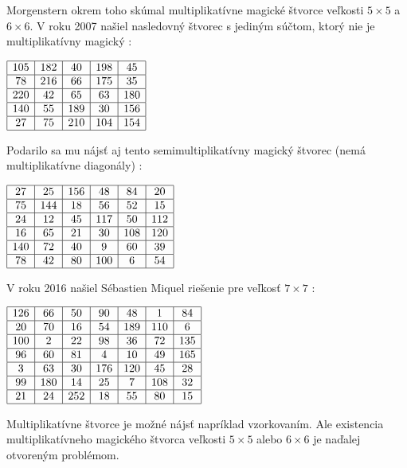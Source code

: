 Morgenstern okrem toho skúmal multiplikatívne magické štvorce veľkosti $5 \times 5$ a $6 \times 6$. V roku 2007 našiel nasledovný štvorec s jediným súčtom, ktorý nie je multiplikatívny magický \cite{multimagie}:

\begin{center}
$\begin{array}{ |c|c|c|c|c| }
\hline
105 & 182 & 40 & 198 & 45 \\ 
\hline
78 & 216 & 66 & 175 & 35  \\ 
\hline
220 & 42 & 65 & 63 & 180 \\ 
\hline
140 & 55 & 189 & 30 & 156 \\ 
\hline
27 & 75 & 210 & 104 & 154 \\ 
\hline
\end{array}$
\end{center}

Podarilo sa mu nájsť aj tento semimultiplikatívny magický štvorec (nemá multiplikatívne diagonály) \cite{multimagie}:

\begin{center}
$\begin{array}{ |c|c|c|c|c|c| }
\hline
27 & 25 & 156 & 48 & 84 & 20 \\ 
\hline
75 & 144 & 18 & 56 & 52 & 15 \\ 
\hline
24 & 12 & 45 & 117 & 50 & 112 \\ 
\hline
16 & 65 & 21 & 30 & 108 & 120 \\ 
\hline
140 & 72 & 40 & 9 & 60 & 39 \\ 
\hline
78 & 42 & 80 & 100 & 6 & 54 \\
\hline
\end{array}$
\end{center}

V roku 2016 našiel Sébastien Miquel riešenie pre veľkosť $7 \times 7$  \cite{multimagie}:

\begin{center}
$\begin{array}{ |c|c|c|c|c|c|c| } 
\hline
126 & 66 & 50 & 90 & 48 & 1 & 84 \\ 
\hline
20 & 70 & 16 & 54 & 189 & 110 & 6 \\ 
\hline
100 & 2 & 22 & 98 & 36 & 72 & 135 \\
\hline
96 & 60 & 81 & 4 & 10 & 49 & 165 \\
\hline
3 & 63 & 30 & 176 & 120 & 45 & 28 \\
\hline
99 & 180 & 14 & 25 & 7 & 108 & 32 \\
\hline
21 & 24 & 252 & 18 & 55 & 80 & 15 \\
\hline
\end{array}$
\end{center}

Multiplikatívne štvorce je možné nájsť napríklad vzorkovaním. Ale existencia multiplikatívneho magického štvorca veľkosti $5 \times 5$ alebo $6 \times 6$ je naďalej otvoreným problémom.











